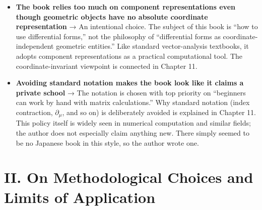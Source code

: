 \documentclass[a4paper,12pt,openany]{book}
\begin{document}
\begin{itemize}
  subtraction. The more standard abstract viewpoint is signposted in
  Chapter 11.
\item
  \textbf{The book relies too much on component representations even though geometric objects have no absolute coordinate representation}
  → An intentional choice. The subject of this book is ``how to use
  differential forms,'' not the philosophy of ``differential forms as
  coordinate-independent geometric entities.'' Like standard
  vector-analysis textbooks, it adopts component representations as a
  practical computational tool. The coordinate-invariant viewpoint is
  connected in Chapter 11.
\item
  \textbf{Avoiding standard notation makes the book look like it claims a private school}
  → The notation is chosen with top priority on ``beginners can work by
  hand with matrix calculations.'' Why standard notation (index
  contraction, \(\partial_\mu\), and so on) is deliberately avoided is
  explained in Chapter 11. This policy itself is widely seen in
  numerical computation and similar fields; the author does not
  especially claim anything new. There simply seemed to be no Japanese
  book in this style, so the author wrote one.
\end{itemize}

\par\vspace{0.35em}\par

\hypertarget{ii.-on-methodological-choices-and-limits-of-application}{%
\section{II. On Methodological Choices and Limits of
Application}\label{ii.-on-methodological-choices-and-limits-of-application}}
\end{document}
